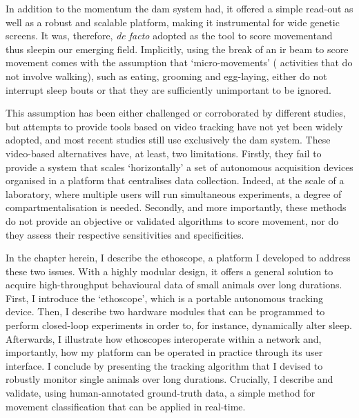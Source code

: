 In addition to the momentum the \gls{dam} system had, it offered a simple read-out as well as a robust and scalable platform, making it instrumental for wide genetic screens.
It was, therefore, \emph{de facto} adopted as the tool to score movement\emd{}and thus sleep\emd{}in our emerging field. 
Implicitly, using the break of an \gls{ir} beam to score movement comes with the assumption that  `micro-movements' (\ie{} activities that do not involve walking), such as eating, grooming and egg-laying,
either do not interrupt sleep bouts or that they are sufficiently unimportant to be ignored.

This assumption has been either challenged\cite{gilestro_video_2012,faville_how_2015} or corroborated\cite{shaw_correlates_2000,garbe_context-specific_2015} by different studies,
but attempts to provide tools based on video tracking have not yet been widely adopted, and most recent studies still use exclusively the \gls{dam} system.
These video-based alternatives have, at least, two limitations. 
Firstly, they fail to provide a system that scales `horizontally'\emd{}\ie{} a set of autonomous acquisition devices organised in a platform that centralises data collection.
Indeed, at the scale of a laboratory, where multiple users will run simultaneous experiments, a degree of compartmentalisation is needed.
Secondly, and more importantly, these methods do not provide an objective or validated algorithms to score movement, nor do they assess their respective sensitivities and specificities. 

In the chapter herein, I describe the ethoscope, a platform I developed to address these two issues.
With a highly modular design, it offers a general solution to acquire high-throughput behavioural data of small animals over long durations.
First, I introduce the `ethoscope', which is a portable autonomous tracking device.
Then, I describe two hardware modules that can be programmed to perform closed-loop experiments in order to, for instance, dynamically alter sleep.
Afterwards, I illustrate how ethoscopes interoperate within a network and, importantly, how my platform can be operated in practice through its user interface.
I conclude by presenting the tracking algorithm that I devised to robustly monitor single animals over long durations.
Crucially, I describe and validate, using human-annotated ground-truth data, a simple method for movement classification that can be applied in real-time.

